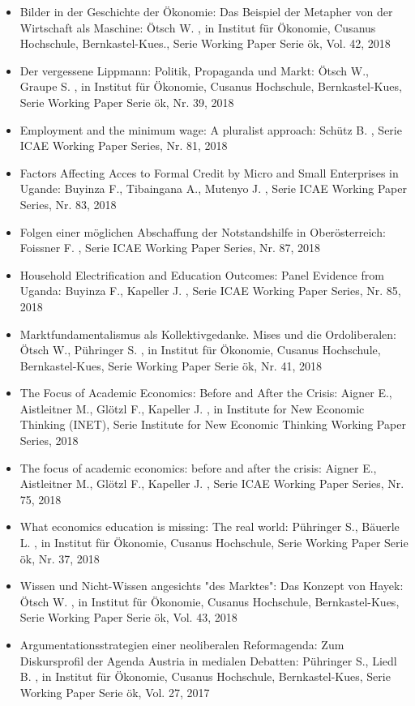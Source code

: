 \begin{itemize}
\item Bilder in der Geschichte der Ökonomie: Das Beispiel der Metapher von der Wirtschaft als Maschine: Ötsch W. , in Institut für Ökonomie, Cusanus Hochschule, Bernkastel-Kues., Serie Working Paper Serie ök, Vol. 42, 2018
\item Der vergessene Lippmann: Politik, Propaganda und Markt: Ötsch W., Graupe S. , in Institut für Ökonomie, Cusanus Hochschule, Bernkastel-Kues, Serie Working Paper Serie ök, Nr. 39, 2018
\item Employment and the minimum wage: A pluralist approach: Schütz B. , Serie ICAE Working Paper Series, Nr. 81, 2018
\item Factors Affecting Acces to Formal Credit by Micro and Small Enterprises in Ugande: Buyinza F., Tibaingana A., Mutenyo J. , Serie ICAE Working Paper Series, Nr. 83, 2018
\item Folgen einer möglichen Abschaffung der Notstandshilfe in Oberösterreich: Foissner F. , Serie ICAE Working Paper Series, Nr. 87, 2018
\item Household Electrification and Education Outcomes: Panel Evidence from Uganda: Buyinza F., Kapeller J. , Serie ICAE Working Paper Series, Nr. 85, 2018
\item Marktfundamentalismus als Kollektivgedanke. Mises und die Ordoliberalen: Ötsch W., Pühringer S. , in Institut für Ökonomie, Cusanus Hochschule, Bernkastel-Kues, Serie Working Paper Serie ök, Nr. 41, 2018
\item The Focus of Academic Economics: Before and After the Crisis: Aigner E., Aistleitner M., Glötzl F., Kapeller J. , in Institute for New Economic Thinking (INET), Serie Institute for New Economic Thinking  Working Paper Series, 2018
\item The focus of academic economics: before and after the crisis: Aigner E., Aistleitner M., Glötzl F., Kapeller J. , Serie ICAE Working Paper Series, Nr. 75, 2018
\item What economics education is missing: The real world: Pühringer S., Bäuerle L. , in Institut für Ökonomie, Cusanus Hochschule, Serie Working Paper Serie ök, Nr. 37, 2018
\item Wissen und Nicht-Wissen angesichts "des Marktes": Das Konzept von Hayek: Ötsch W. , in Institut für Ökonomie, Cusanus Hochschule, Bernkastel-Kues, Serie Working Paper Serie ök, Vol. 43, 2018
\item Argumentationsstrategien einer neoliberalen Reformagenda: Zum Diskursprofil der Agenda Austria in medialen Debatten: Pühringer S., Liedl B. , in Institut für Ökonomie, Cusanus Hochschule, Bernkastel-Kues, Serie Working Paper Serie ök, Vol. 27, 2017

\end{itemize}
